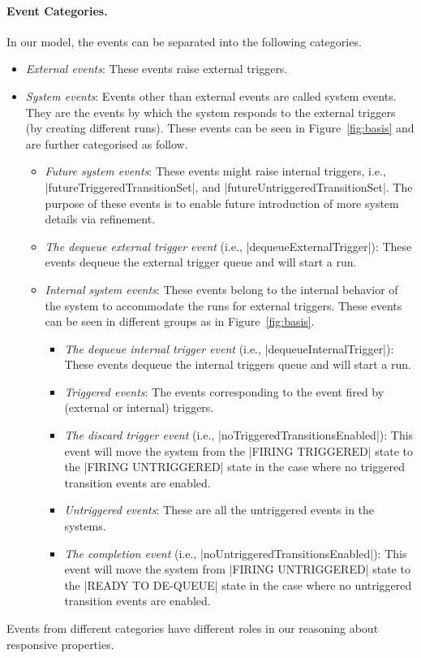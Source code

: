 \paragraph{Event Categories.} In our \EventB model, the events can
be separated into the following categories.
\begin{itemize}
\item \emph{External events}: These events raise external triggers.
  
\item \emph{System events}: Events other than external events are
  called system events. They are the events by which the system
  responds to the external triggers (by creating different runs).
  These events can be seen in Figure~\ref{fig:basis} and are further
  categorised as follow.
  \begin{itemize}
  \item \emph{Future system events}: These events might raise internal
    triggers, i.e., |futureTriggeredTransitionSet|, and
    |futureUntriggeredTransitionSet|.  The purpose of these events is
    to enable future introduction of more system details via
    refinement.
    
  \item \emph{The dequeue external trigger event} (i.e.,
    |dequeueExternalTrigger|): These events dequeue the
    external trigger queue and will start a run.

  \item \emph{Internal system events}: These events belong to the
    internal behavior of the system to accommodate the runs for external
    triggers.  These events can be seen in different groups as in
    Figure~\ref{fig:basis}.
    \begin{itemize}
    \item \emph{The dequeue internal trigger event} (i.e.,
      |dequeueInternalTrigger|): These events dequeue the
      internal triggers queue and will start a run.
    
    \item \emph{Triggered events}: The events corresponding to the
     event fired by (external or internal) triggers.

    \item \emph{The discard trigger event} (i.e.,
      |noTriggeredTransitionsEnabled|):  This event will move the system
      from the |FIRING TRIGGERED| state to the |FIRING UNTRIGGERED| state 
      in the case where no triggered transition events are enabled.
    
    \item \emph{Untriggered events}:  These are all the untriggered 
    events in the systems.

    \item \emph{The completion event} (i.e.,
      |noUntriggeredTransitionsEnabled|): This event will move the
      system from |FIRING UNTRIGGERED| state to the |READY TO DE-QUEUE|
      state in the case where no untriggered transition events are
      enabled.
    \end{itemize}
  \end{itemize}
\end{itemize}
Events from different categories have different roles in our reasoning
about responsive properties.

